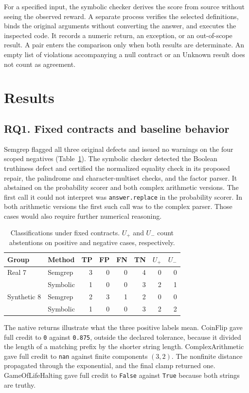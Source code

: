 \documentclass[sigconf]{acmart}
\begin{document}
For a specified input, the symbolic checker derives the score from source without seeing the observed reward. A separate process verifies the selected definitions, binds the original arguments without converting the answer, and executes the inspected code. It records a numeric return, an exception, or an out-of-scope result. A pair enters the comparison only when both results are determinate. An empty list of violations accompanying a null contract or an Unknown result does not count as agreement.

\section{Results}

\subsection{RQ1. Fixed contracts and baseline behavior}

Semgrep flagged all three original defects and issued no warnings on the four scoped negatives (Table~\ref{tab:baseline}). The symbolic checker detected the Boolean truthiness defect and certified the normalized equality check in its proposed repair, the palindrome and character-multiset checks, and the factor parser. It abstained on the probability scorer and both complex arithmetic versions. The first call it could not interpret was \texttt{answer.replace} in the probability scorer. In both arithmetic versions the first such call was to the complex parser. Those cases would also require further numerical reasoning.

\begin{table}[t]
\caption{Classifications under fixed contracts. $U_+$ and $U_-$ count abstentions on positive and negative cases, respectively.}
\label{tab:baseline}
\centering\small
\begin{tabular}{@{}llrrrrrr@{}}
\toprule
Group & Method & TP & FP & FN & TN & $U_+$ & $U_-$\\
\midrule
Real 7 & Semgrep & 3&0&0&4&0&0\\
 & Symbolic & 1&0&0&3&2&1\\
\midrule
Synthetic 8 & Semgrep & 2&3&1&2&0&0\\
 & Symbolic & 1&0&0&3&2&2\\
\bottomrule
\end{tabular}
\end{table}

The native returns illustrate what the three positive labels mean. CoinFlip gave full credit to \texttt{0} against \texttt{0.875}, outside the declared tolerance, because it divided the length of a matching prefix by the shorter string length. ComplexArithmetic gave full credit to \texttt{nan} against finite components $(3,2)$. The nonfinite distance propagated through the exponential, and the final clamp returned one. GameOfLifeHalting gave full credit to \texttt{False} against \texttt{True} because both strings are truthy.
\end{document}
